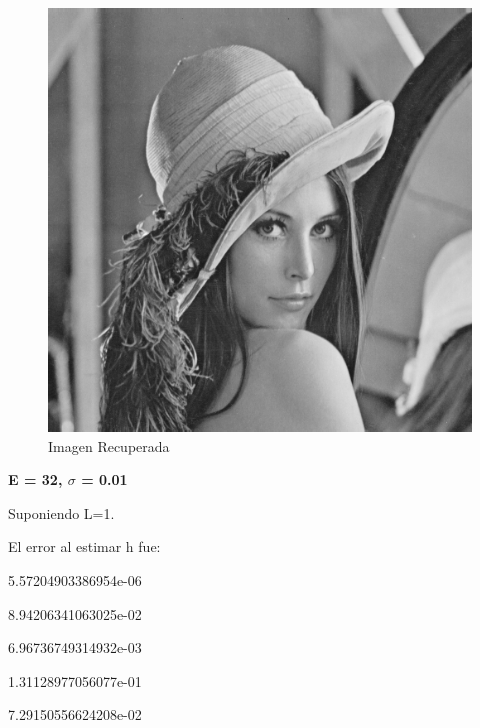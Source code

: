 \documentclass{article}
\begin{document}
\begin{multicols}{2}
\begin{figure}[H]
\centering
\includegraphics[scale=0.2]{../img/corrected_part3c.png}
\caption{Imagen Recuperada}

\end{figure}



\textbf{\large E = 32,  $\sigma$ = 0.01  }\\

\par \large{Suponiendo L=1.}
\par El error al estimar h fue:\\ 
\par   5.57204903386954e-06
\par   8.94206341063025e-02
\par   6.96736749314932e-03
\par   1.31128977056077e-01
\par   7.29150556624208e-02\\



\end{multicols}
\end{document}
